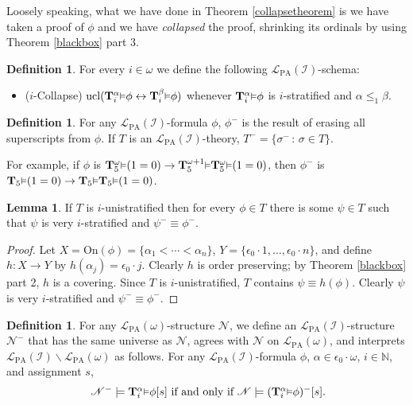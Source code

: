 \documentclass[reqno]{article}
\theoremstyle{definition}
\newtheorem{lemma}[theorem]{Lemma}
\newtheorem{definition}[theorem]{Definition}
\def\N{\mathbb{N}}
\def\L{\mathscr{L}}
\def\T{\mathbf{T}}
\def\LPA{\L_{\mathrm{PA}}}
\def\epom{\epsilon_0\cdot\omega}
\def\indset{\mathcal I}
\def\onset{\mathrm{On}}
\renewcommand{\Pr}[1]{\T_{#1}\mbox{\small${\vDash}$}}
\newcommand{\Prr}[2]{\T^{#1}_{#2}\mbox{\small${\vDash}$}}
\newcommand{\ucl}[1]{\mathrm{ucl}(#1)}
\begin{document}
Loosely speaking, what we have done in Theorem \ref{collapsetheorem} is we have
taken a proof of $\phi$ and we have \emph{collapsed} the proof, shrinking its ordinals
by using Theorem \ref{blackbox} part 3.

\begin{definition}
For every $i\in\omega$ we define the following $\LPA(\indset)$-schema:
\begin{itemize}
\item ($i$-Collapse) $\ucl{\Prr\alpha i\phi\leftrightarrow\Prr\beta i\phi}$ whenever
$\Prr\alpha i\phi$ is $i$-stratified and $\alpha\leq_1\beta$.
\end{itemize}
\end{definition}

\begin{definition}
For any $\LPA(\indset)$-formula $\phi$, $\phi^-$ is the result of erasing 
all superscripts from $\phi$.
If $T$ is an $\LPA(\indset)$-theory, $T^-=\{\sigma^-\,:\,\sigma\in 
T\}$.
\end{definition}

For example, if $\phi$ is $\Prr{\omega}{5}(1=0)\rightarrow\Prr{\omega+1}{5}\Prr{\omega}{5}(1=0)$,
then $\phi^-$ is $\Pr{5}(1=0)\rightarrow\Pr{5}\Pr{5}(1=0)$.

\begin{lemma}
\label{verystratifiableaxioms}
If $T$ is $i$-unistratified then for every $\phi\in T$ there is some $\psi\in T$
such that $\psi$ is very $i$-stratified and $\psi^-\equiv\phi^-$.
\end{lemma}

\begin{proof}
Let $X=\onset(\phi)=\{\alpha_1<\cdots<\alpha_n\}$, $Y=\{\epsilon_0\cdot 1,\ldots,\epsilon_0\cdot n\}$,
and define $h:X\to Y$ by $h(\alpha_j)=\epsilon_0\cdot j$.
Clearly $h$ is order preserving; by Theorem \ref{blackbox} part 2, $h$ is a covering.
Since $T$ is $i$-unistratified, $T$ contains $\psi\equiv h(\phi)$.  Clearly $\psi$ is very $i$-stratified and
$\psi^-\equiv\phi^-$.
\end{proof}

\begin{definition}
For any $\LPA(\omega)$-structure $\mathscr N$,
we define an $\LPA(\indset)$-structure $\mathscr N^-$
that has the same universe as $\mathscr N$, agrees with $\mathscr N$
on $\LPA(\omega)$,
and interprets $\LPA(\indset)\backslash\LPA(\omega)$ as follows.
For any $\LPA(\indset)$-formula $\phi$, $\alpha\in\epom$, $i\in\N$, and assignment $s$,
\[
\mbox{
$\mathscr N^- \models \Prr\alpha i\phi[s]$ if and only if $\mathscr N\models (\Prr\alpha i\phi)^-[s]$.}
\]
\end{definition}
\end{document}
